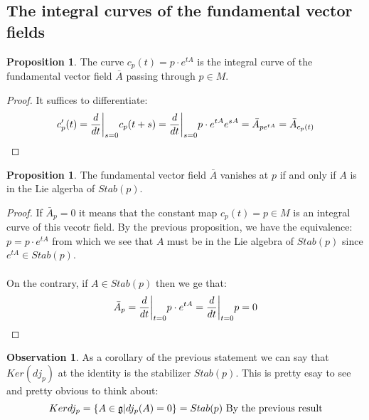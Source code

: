 \documentclass[12pt,a4paper]{report}
\theoremstyle{definition}
\theoremstyle{Theorem}
\newtheorem{Prop}[Def]{Proposition}
\theoremstyle{definition}
\theoremstyle{definition}
\newtheorem{Obs}[Def]{Observation}
\begin{document}
		\subsection{The integral curves of the fundamental vector fields}
		\begin{Prop}
			The curve $c_p(t)=p\cdot e^{tA}$ is the integral curve of the fundamental vector field $\bar{A}$ passing through $p\in M$.
		\end{Prop}
		\begin{proof}
			It suffices to differentiate:
			$$c'_p(t)={d\over dt}\bigg|_{s=0}c_p(t+s)=
			{d\over dt}\bigg|_{s=0}p\cdot e^{tA}e^{sA}=\bar{A}_{pe^{tA}}=
			\bar{A}_{c_p(t)}$$
		\end{proof}
		\begin{Prop}
			The fundamental vector field $\bar{A}$ vanishes at $p$ if and only if $A$ is in the Lie algerba of $Stab(p)$.
		\end{Prop}
		\begin{proof}
			If $\bar{A}_p=0$ it means that the constant map $c_p(t)=p\in M$ is an integral curve of this vecotr field. By the previous proposition, we have the equivalence:
			$p=p\cdot e^{tA}$ from which we see that $A$ must be in the Lie algebra of $Stab(p)$ since $e^{tA}\in Stab(p)$.\\
			\\
			On the contrary, if $A\in Stab(p)$ then we ge that:
			$$\bar{A}_p={d\over dt}\bigg|_{t=0}p\cdot e^{tA}=
			{d\over dt}\bigg|_{t=0}p=0$$
		\end{proof}
		\begin{Obs}
			As a corollary of the previous statement we can say that $Ker(dj_p)$ at the identity is the stabilizer $Stab(p)$. This is pretty esay to see and pretty obvious to think about:
			$$Ker dj_p=\{A\in \mathfrak{g}|dj_p(A)=0\}=Stab(p)\hbox{ By the previous result}$$
		\end{Obs}
\end{document}
